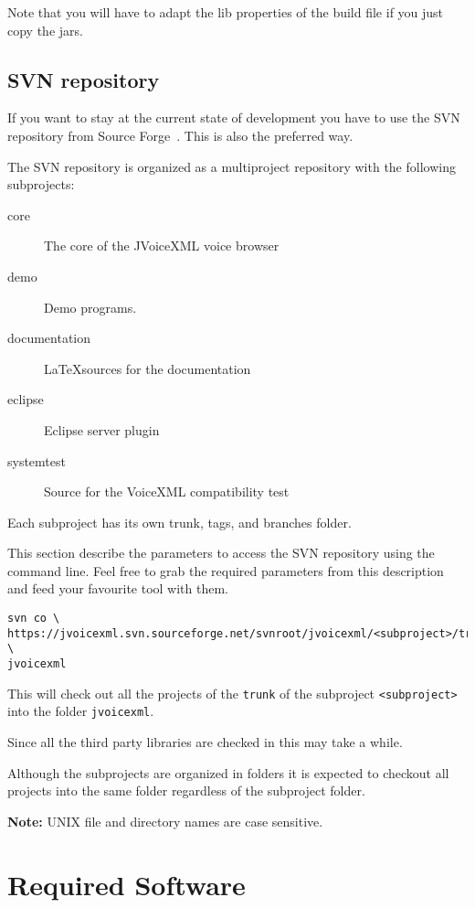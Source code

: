 \documentclass[11pt,a4paper]{article}
\begin{document}
Note that you will have to adapt the lib properties of the build file
if you just copy the jars.

\subsection{SVN repository}
\label{sec:svn-repository}

If you want to stay at the current state of development you have to use
the SVN repository from Source Forge~\cite{sourceforge}.
This is also the preferred way.

The SVN repository is organized as a multiproject repository with the following
subprojects:
\begin{description}
\item[core] The core of the JVoiceXML voice browser
\item[demo] Demo programs.
\item[documentation] \LaTeX sources for the documentation
\item[eclipse] Eclipse server plugin
\item[systemtest] Source for the VoiceXML compatibility test
\end{description}

Each subproject has its own trunk, tags, and branches folder.

This section describe the parameters to access the SVN repository 
using the command line. Feel free to grab the required parameters from
this description and feed your favourite tool with them.

\begin{lstlisting}
svn co \
https://jvoicexml.svn.sourceforge.net/svnroot/jvoicexml/<subproject>/trunk \
jvoicexml
\end{lstlisting}

This will check out all the projects of the \lstinline{trunk} of
the subproject \lstinline{<subproject>} into the folder \lstinline{jvoicexml}.

Since all the third party libraries are checked in this may
take a while.

Although the subprojects are organized in folders it is expected to
checkout all projects into the same folder regardless of the subproject folder.

\textbf{Note:} UNIX file and directory names are case sensitive.

\section{Required Software}
\label{sec:required-software}
\end{document}
